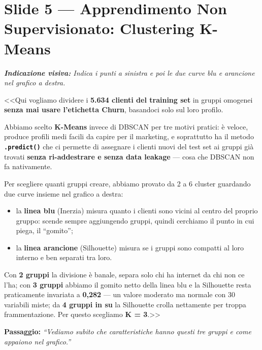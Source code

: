 \documentclass[10pt, a4paper]{article}
\newcommand{\cue}[1]{%
  \par\vspace{1pt}\noindent\colorbox{CueBg}{\parbox{\dimexpr\linewidth-2\fboxsep}{\footnotesize\textit{\color{PrimaryNavy}\textbf{Indicazione visiva:} #1}}}\par\vspace{2pt}%
}
\newcommand{\transition}[1]{%
  \par\vspace{1pt}\noindent\colorbox{LightBg}{\parbox{\dimexpr\linewidth-2\fboxsep}{\small\textbf{\color{SecondaryBlue}Passaggio:} \textit{``#1''}}}\par\vspace{2pt}%
}
\begin{document}
\section*{Slide 5 --- Apprendimento Non Supervisionato: Clustering K-Means}
\cue{Indica i punti a sinistra e poi le due curve blu e arancione nel grafico a destra.}
\noindent <<Qui vogliamo dividere i \textbf{5.634 clienti del training set} in gruppi omogenei \textbf{senza mai usare l'etichetta Churn}, basandoci solo sul loro profilo.

Abbiamo scelto \textbf{K-Means} invece di DBSCAN per tre motivi pratici: è veloce, produce profili medi facili da capire per il marketing, e soprattutto ha il metodo \textbf{\texttt{.predict()}} che ci permette di assegnare i clienti nuovi del test set ai gruppi già trovati \textbf{senza ri-addestrare e senza data leakage} --- cosa che DBSCAN non fa nativamente.

Per scegliere quanti gruppi creare, abbiamo provato da 2 a 6 cluster guardando due curve insieme nel grafico a destra:
\begin{itemize}
    \item la \textbf{linea blu} (Inerzia) misura quanto i clienti sono vicini al centro del proprio gruppo: scende sempre aggiungendo gruppi, quindi cerchiamo il punto in cui piega, il ``gomito'';
    \item la \textbf{linea arancione} (Silhouette) misura se i gruppi sono compatti al loro interno e ben separati tra loro.
\end{itemize}
Con \textbf{2 gruppi} la divisione è banale, separa solo chi ha internet da chi non ce l'ha; con \textbf{3 gruppi} abbiamo il gomito netto della linea blu e la Silhouette resta praticamente invariata a \textbf{0,282} --- un valore moderato ma normale con 30 variabili miste; da \textbf{4 gruppi in su} la Silhouette crolla nettamente per troppa frammentazione. Per questo scegliamo \textbf{K = 3}.>>
\transition{Vediamo subito che caratteristiche hanno questi tre gruppi e come appaiono nel grafico.}
\end{document}
